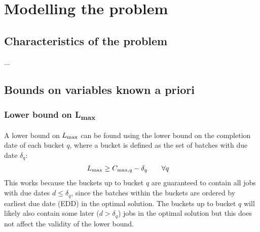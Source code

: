 \documentclass[13pt, letterpaper, twoside]{book}
\begin{document}
\chapter{Modelling the problem}
\section{Characteristics of the problem}

...

\section{Bounds on variables known a priori}

\subsection{Lower bound on {\sansitalicfont L}\textsubscript{max}}
A lower bound on $L_{\text{max}}$ can be found using the lower bound on the completion
date of each bucket $q$, where a bucket is defined as the set of batches with
due date $\delta_q$:
\begin{alignat}{2}
& L_{\text{max}} \geq C_{\text{max},q} - \delta_q \quad && \forall q
\end{alignat}
This works because the buckets up to bucket $q$ are guaranteed to contain all
jobs with due dates $d \leq \delta_q$, since the batches within the buckets are
ordered by earliest due date (EDD) in the optimal solution. The buckets up to
bucket $q$ will likely also contain some later ($d > \delta_q$) jobs in the
optimal solution but this does not affect the validity of the lower bound.
\end{document}
